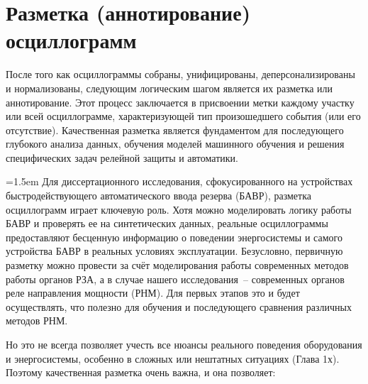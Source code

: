 
\section{Разметка (аннотирование) осциллограмм}\label{sec:ch3_oscillogram_annotation}

После того как осциллограммы собраны, унифицированы, деперсонализированы и нормализованы, следующим логическим шагом является их разметка или аннотирование. Этот процесс заключается в присвоении метки каждому участку или всей осциллограмме, характеризующей тип произошедшего события (или его отсутствие). Качественная разметка является фундаментом для последующего глубокого анализа данных, обучения моделей машинного обучения и решения специфических задач релейной защиты и автоматики.

{\emergencystretch=1.5em Для диссертационного исследования, сфокусированного на устройствах быстродействующего автоматического ввода резерва (БАВР), разметка осциллограмм играет ключевую роль. Хотя можно моделировать логику работы БАВР и проверять ее на синтетических данных, реальные осциллограммы предоставляют бесценную информацию о поведении энергосистемы и самого устройства БАВР в реальных условиях эксплуатации. Безусловно, первичную разметку можно провести за счёт моделирования работы современных методов работы органов РЗА, а в случае нашего исследования~-- современных органов реле направления мощности (РНМ). Для первых этапов это и будет осуществлять, что полезно для обучения и последующего сравнения различных методов РНМ.\par}

Но это не всегда позволяет учесть все нюансы реального поведения оборудования и энергосистемы, особенно в сложных или нештатных ситуациях (Глава 1х). Поэтому качественная разметка очень важна, и она позволяет:

